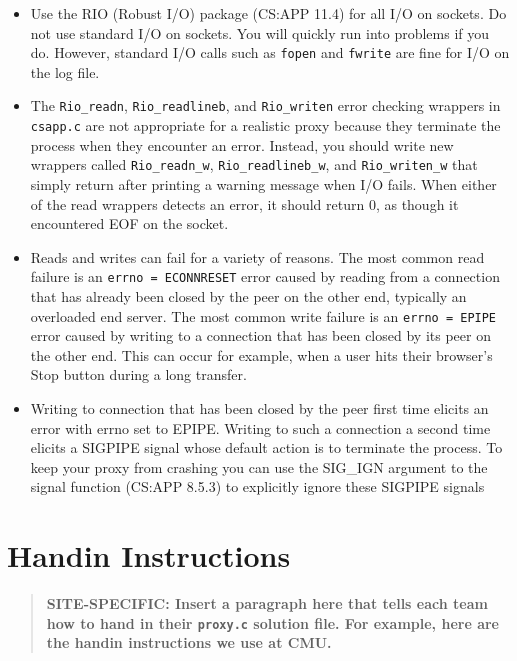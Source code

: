 \documentclass[11pt]{article}
\begin{document}
\begin{itemize}
\item Use the RIO (Robust I/O) package (CS:APP 11.4) for all 
I/O on sockets. Do not use standard I/O on sockets. You will quickly
run into problems if you do. However, standard I/O calls such as
\texttt{fopen} and \texttt{fwrite} are fine for I/O on the log file.

\item The \texttt{Rio\_readn}, \texttt{Rio\_readlineb}, and \texttt{Rio\_writen}
error checking wrappers in \texttt{csapp.c} are not appropriate for a
realistic proxy because they terminate the process when they
encounter an error. Instead, you should write new wrappers called
\texttt{Rio\_readn\_w}, \texttt{Rio\_readlineb\_w}, and
\texttt{Rio\_writen\_w} that simply return after printing a warning
message when I/O fails. When either of the read wrappers detects an
error, it should return 0, as though it encountered EOF on the socket.

\item Reads and writes can fail for a variety of reasons. The most
common read failure is an \texttt{errno = ECONNRESET} error caused by
reading from a connection that has already been closed by the peer on
the other end, typically an overloaded end server.
The most common write failure is
an \texttt{errno = EPIPE} error caused by writing to a connection that
has been closed by its peer on the other end. This can occur for
example, when a user hits their browser's Stop button during a long
transfer.

\item Writing to connection that has been closed by the peer first time
elicits an error with errno set to EPIPE. Writing to such a
connection a second time elicits a SIGPIPE signal whose default
action is to terminate the process. To keep your proxy from
crashing you can use the SIG\_IGN argument to the signal function
(CS:APP 8.5.3) to explicitly ignore these SIGPIPE signals

\end{itemize}

\section*{Handin Instructions}

\begin{quote}
\bf SITE-SPECIFIC: Insert a paragraph here that tells each team how to
hand in their \texttt{proxy.c} solution file. For example, here are 
the handin instructions we use at CMU.
\end{quote}
\end{document}
